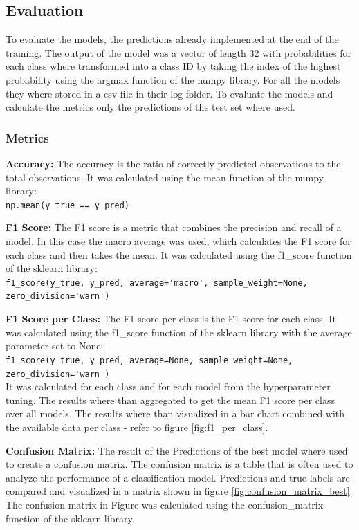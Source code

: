 \subsection{Evaluation}%

To evaluate the models, the predictions already implemented at the end of the training.
The output of the model was a vector of length 32 with probabilities for each class where
transformed into a class ID by taking the index of the highest probability
using the argmax function of the numpy library. For all the models they where stored in a csv file
in their log folder. To evaluate the models and calculate the metrics only the predictions
of the test set where used.

\subsubsection{Metrics}%

\textbf{Accuracy:} The accuracy is the ratio of correctly predicted observations to the total observations.
It was calculated using the mean function of the numpy library:\\ \lstinline{np.mean(y_true == y_pred)}

\textbf{F1 Score:} The F1 score is a metric that combines the precision and recall of a model. In this
case the macro average was used, which calculates the F1 score for each class and then takes the mean.
It was calculated using the f1\_score function of the sklearn library:\\ 
\lstinline{f1_score(y_true, y_pred, average='macro', sample_weight=None, zero_division='warn')}

\textbf{F1 Score per Class:} The F1 score per class is the F1 score for each class. It was calculated
using the f1\_score function of the sklearn library with the average parameter set to None:\\
\lstinline{f1_score(y_true, y_pred, average=None, sample_weight=None, zero_division='warn')}\\
It was calculated for each class and for each model from the hyperparameter tuning. The results
where than aggregated to get the mean F1 score per class over all models. The results where
than visualized in a bar chart combined with the available data per class - refer to
figure \ref{fig:f1_per_class}.

\textbf{Confusion Matrix:} The result of the Predictions of the best model where used to create a confusion matrix.
The confusion matrix is a table that is often used to analyze the performance of a classification model.
Predictions and true labels are compared and visualized in a matrix shown in figure \ref{fig:confusion_matrix_best}. 
The confusion matrix in Figure was calculated using the confusion\_matrix function of the sklearn library.

